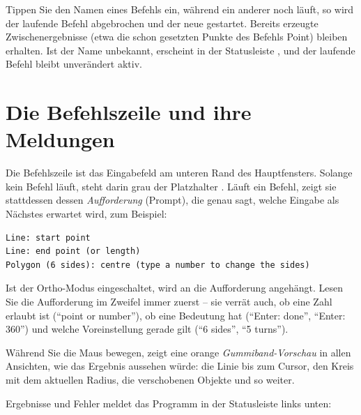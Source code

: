 Tippen Sie den Namen eines Befehls ein, während ein anderer noch läuft, so wird der laufende
Befehl abgebrochen und der neue gestartet. Bereits erzeugte Zwischenergebnisse (etwa die schon
gesetzten Punkte des Befehls Point) bleiben erhalten. Ist der Name unbekannt, erscheint in der
Statusleiste , und der laufende Befehl bleibt unverändert aktiv.

\section{Die Befehlszeile und ihre Meldungen}\label{sec:mod-befehlszeile}

Die Befehlszeile ist das Eingabefeld am unteren Rand des Hauptfensters. Solange kein Befehl
läuft, steht darin grau der Platzhalter . Läuft ein Befehl, zeigt sie stattdessen
dessen \emph{Aufforderung} (Prompt), die genau sagt, welche Eingabe als Nächstes erwartet wird,
zum Beispiel:

\begin{lstlisting}
Line: start point
Line: end point (or length)
Polygon (6 sides): centre (type a number to change the sides)
\end{lstlisting}

Ist der Ortho-Modus eingeschaltet, wird an die Aufforderung \code{[Ortho]} angehängt. Lesen Sie
die Aufforderung im Zweifel immer zuerst -- sie verrät auch, ob eine Zahl erlaubt ist (\enquote{point
or number}), ob  eine Bedeutung hat (\enquote{Enter: done}, \enquote{Enter: 360})
und welche Voreinstellung gerade gilt (\enquote{6 sides}, \enquote{5 turns}).

Während Sie die Maus bewegen, zeigt eine orange \emph{Gummiband-Vorschau} in
allen Ansichten, wie das Ergebnis aussehen würde: die Linie bis zum Cursor, den Kreis mit dem
aktuellen Radius, die verschobenen Objekte und so weiter.

Ergebnisse und Fehler meldet das Programm in der Statusleiste links unten:

